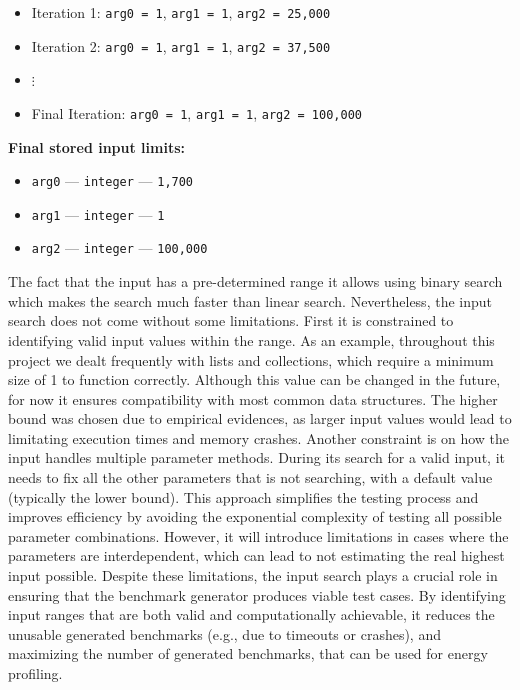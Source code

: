 \begin{tcolorbox}
\begin{itemize}
    \item Iteration 1: \texttt{arg0 = 1}, \texttt{arg1 = 1}, \texttt{arg2 = 25,000}
    \item Iteration 2: \texttt{arg0 = 1}, \texttt{arg1 = 1}, \texttt{arg2 = 37,500}
    \item $\vdots$
    \item Final Iteration: \texttt{arg0 = 1}, \texttt{arg1 = 1}, \texttt{arg2 = 100,000}
\end{itemize}

\textbf{Final stored input limits:}
\begin{itemize}
    \item \texttt{arg0} — \texttt{integer} — \texttt{1,700}
    \item \texttt{arg1} — \texttt{integer} — \texttt{1}
    \item \texttt{arg2} — \texttt{integer} — \texttt{100,000}
\end{itemize}

\end{tcolorbox}


The fact that the input has a pre-determined range it allows using binary search which makes the search much faster than linear search.
Nevertheless, the input search does not come without some limitations. First it is constrained to identifying valid input values within the range. As an example, throughout this project we dealt frequently with lists and collections, which require a minimum size of 1 to function correctly. Although this value can be changed in the future, for now it ensures compatibility with most common data structures. The higher bound was chosen due to empirical evidences, as larger input values would lead to limitating execution times and memory crashes. Another constraint is on how the input handles multiple parameter methods. During its search for a valid input, it needs to fix all the other parameters that is not searching, with a default value (typically the lower bound). This approach simplifies the testing process and improves efficiency by avoiding the exponential complexity of testing all possible parameter combinations. However, it will introduce limitations in cases where the parameters are interdependent, which can lead to not estimating the real highest input possible. 
Despite these limitations, the input search plays a crucial role in ensuring that the benchmark generator produces viable test cases. By identifying input ranges that are both valid and computationally achievable, it reduces the unusable generated benchmarks (e.g., due to timeouts or crashes), and maximizing the number of generated benchmarks, that can be used for energy profiling.



